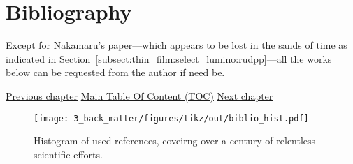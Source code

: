 \chapter{Bibliography}\label{chap:biblio}

\begin{tldrbox}
	Except for Nakamaru's paper\cite{nakamaru1979}---which appears to be lost in the sands of time as indicated in Section~\ref{subsect:thin_film:select_lumino:rudpp}---all the works below can be \href{mailto:emmanuel.dervieux@gmail.com}{requested} from the author if need be.
	
	\tcblower
	
	\hyperref[chap:conclusion]{Previous chapter} \hfill \hyperref[chapter:toc]{Main Table Of Content (TOC)} \hfill \hyperref[chap:add_ack]{Next chapter}
	
\end{tldrbox}

\begin{figure}
	\centering
	\texttt{[image: 3\_back\_matter/figures/tikz/out/biblio\_hist.pdf]}
	\caption[Histogram of used references.]{Histogram of used references, coveirng over a century of relentless scientific efforts.}
	\label{fig:biblio:biblio_hist}
\end{figure}

\printbibliography[heading=none]